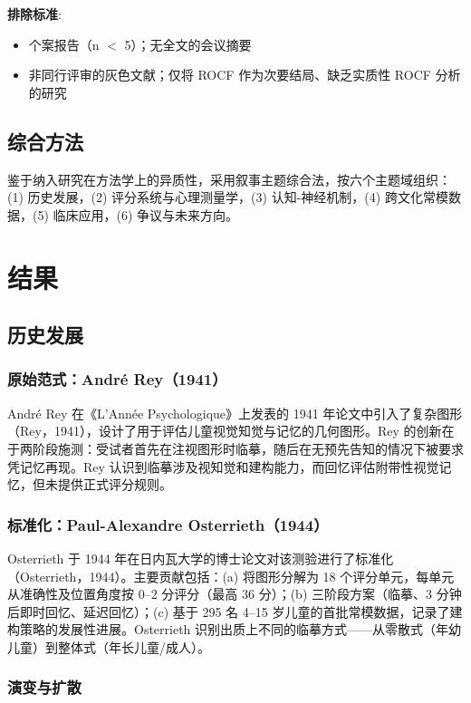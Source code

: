 \documentclass[12pt,a4paper]{ctexart}
\begin{document}
\textbf{排除标准}:
\begin{itemize}
\item 个案报告（n $<$ 5）；无全文的会议摘要
\item 非同行评审的灰色文献；仅将 ROCF 作为次要结局、缺乏实质性 ROCF 分析的研究
\end{itemize}

\subsection{综合方法}

鉴于纳入研究在方法学上的异质性，采用叙事主题综合法，按六个主题域组织：(1) 历史发展，(2) 评分系统与心理测量学，(3) 认知-神经机制，(4) 跨文化常模数据，(5) 临床应用，(6) 争议与未来方向。

\section{结果}

\subsection{历史发展}

\subsubsection{原始范式：André Rey（1941）}

André Rey 在《L'Année Psychologique》上发表的 1941 年论文中引入了复杂图形（Rey，1941），设计了用于评估儿童视觉知觉与记忆的几何图形。Rey 的创新在于两阶段施测：受试者首先在注视图形时临摹，随后在无预先告知的情况下被要求凭记忆再现。Rey 认识到临摹涉及视知觉和建构能力，而回忆评估附带性视觉记忆，但未提供正式评分规则。

\subsubsection{标准化：Paul-Alexandre Osterrieth（1944）}

Osterrieth 于 1944 年在日内瓦大学的博士论文对该测验进行了标准化（Osterrieth，1944）。主要贡献包括：(a) 将图形分解为 18 个评分单元，每单元从准确性及位置角度按 0–2 分评分（最高 36 分）；(b) 三阶段方案（临摹、3 分钟后即时回忆、延迟回忆）；(c) 基于 295 名 4–15 岁儿童的首批常模数据，记录了建构策略的发展性进展。Osterrieth 识别出质上不同的临摹方式——从零散式（年幼儿童）到整体式（年长儿童/成人）。

\subsubsection{演变与扩散}
\end{document}
